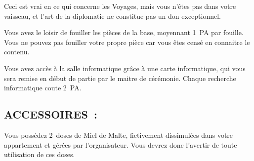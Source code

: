 \documentclass[14pt,twocolumn]{extarticle}
\begin{document}
Ceci est vrai en ce qui concerne les Voyages, mais vous n'êtes pas dans votre
vaisseau, et l'art de la diplomatie ne constitue pas un don exceptionnel.

Vous avez le loisir de fouiller les pièces de la base, moyennant 1~PA par
fouille. Vous ne pouvez pas fouiller votre propre pièce car vous êtes censé en
connaitre le contenu.

Vous avez accès à la salle informatique grâce à une carte informatique, qui
vous sera remise en début de partie par le maitre de cérémonie. Chaque
recherche informatique coute 2~PA.

\subsection{ACCESSOIRES~:}

Vous possédez 2~doses de Miel de Malte, fictivement dissimulées dans votre
appartement et gérées par l'organisateur. Vous devrez donc l'avertir de toute
utilisation de ces doses.
\end{document}
